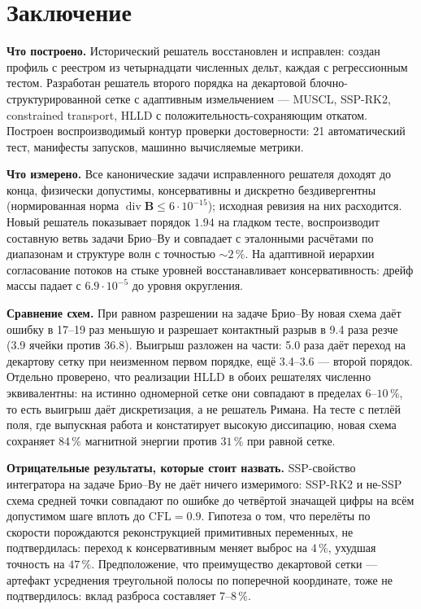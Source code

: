 \documentclass[12pt,a4paper]{article}
\newcommand{\divg}{\operatorname{div}}
\newcommand{\B}{\mathbf{B}}
\begin{document}
\section{Заключение}

\textbf{Что построено.} Исторический решатель восстановлен и исправлен:
создан профиль с реестром из четырнадцати численных дельт, каждая с
регрессионным тестом. Разработан решатель второго порядка на декартовой
блочно-структурированной сетке с адаптивным измельчением --- MUSCL, SSP-RK2,
constrained transport, HLLD с положительность-сохраняющим откатом. Построен
воспроизводимый контур проверки достоверности: 21 автоматический тест,
манифесты запусков, машинно вычисляемые метрики.

\textbf{Что измерено.} Все канонические задачи исправленного решателя доходят до
конца, физически допустимы, консервативны и дискретно бездивергентны
(нормированная норма $\divg\B\leq6\!\cdot\!10^{-15}$); исходная ревизия на них
расходится. Новый решатель показывает порядок $1.94$ на гладком тесте,
воспроизводит составную ветвь задачи Брио--Ву и совпадает с эталонными
расчётами по диапазонам и структуре волн с точностью $\sim2\,\%$. На адаптивной
иерархии согласование потоков на стыке уровней восстанавливает консервативность:
дрейф массы падает с $6.9\!\cdot\!10^{-5}$ до уровня округления.

\textbf{Сравнение схем.} При равном разрешении на задаче Брио--Ву новая схема
даёт ошибку в 17--19 раз меньшую и разрешает контактный разрыв в 9.4 раза резче
(3.9 ячейки против 36.8). Выигрыш разложен на части: 5.0 раза даёт переход на
декартову сетку при неизменном первом порядке, ещё 3.4--3.6 --- второй порядок.
Отдельно проверено, что реализации HLLD в обоих решателях численно эквивалентны:
на истинно одномерной сетке они совпадают в пределах $6\text{--}10\,\%$, то есть
выигрыш даёт дискретизация, а не решатель Римана. На тесте с петлёй поля, где
выпускная работа и констатирует высокую диссипацию, новая схема сохраняет
$84\,\%$ магнитной энергии против $31\,\%$ при равной сетке.

\textbf{Отрицательные результаты, которые стоит назвать.} SSP-свойство
интегратора на задаче Брио--Ву не даёт ничего измеримого: SSP-RK2 и не-SSP схема
средней точки совпадают по ошибке до четвёртой значащей цифры на всём допустимом
шаге вплоть до $\mathrm{CFL}=0.9$. Гипотеза о том, что перелёты по скорости
порождаются реконструкцией примитивных переменных, не подтвердилась: переход к
консервативным меняет выброс на $4\,\%$, ухудшая точность на $47\,\%$.
Предположение, что преимущество декартовой сетки --- артефакт усреднения
треугольной полосы по поперечной координате, тоже не подтвердилось: вклад
разброса составляет $7\text{--}8\,\%$.
\end{document}
